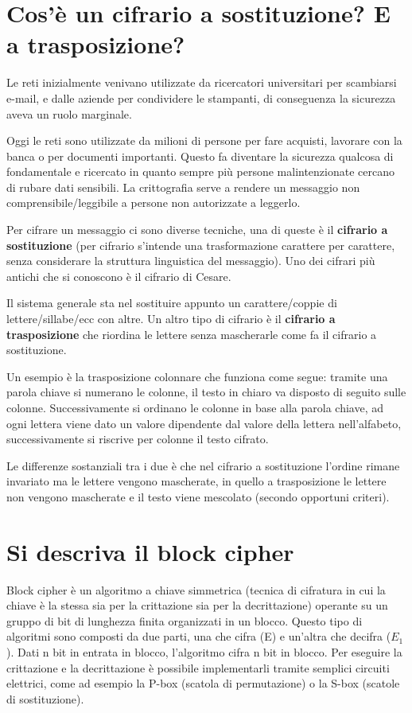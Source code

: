 \section{Cos’è un cifrario a sostituzione? E a trasposizione?}

Le reti inizialmente venivano utilizzate da ricercatori universitari per scambiarsi e-mail, e dalle aziende per condividere le stampanti, di conseguenza la sicurezza aveva un ruolo marginale.

Oggi le reti sono utilizzate da milioni di persone per fare acquisti, lavorare con la banca o per documenti importanti. Questo fa diventare la sicurezza qualcosa di fondamentale e ricercato in quanto sempre più persone malintenzionate cercano di rubare dati sensibili.
La crittografia serve a rendere un messaggio non comprensibile/leggibile a persone non autorizzate a leggerlo.

Per cifrare un messaggio ci sono diverse tecniche, una di queste è il \textbf{cifrario a sostituzione} (per cifrario s’intende una trasformazione carattere per carattere, senza considerare la struttura linguistica del messaggio). Uno dei cifrari più antichi che si conoscono è il cifrario di Cesare.

Il sistema generale sta nel sostituire appunto un carattere/coppie di lettere/sillabe/ecc con altre.
Un altro tipo di cifrario è il \textbf{cifrario a trasposizione} che riordina le lettere senza mascherarle come fa il cifrario a sostituzione.

Un esempio è la trasposizione colonnare che funziona come segue: tramite una parola chiave si numerano le colonne, il testo in chiaro va disposto di seguito sulle colonne. Successivamente si ordinano le colonne in base alla parola chiave, ad ogni lettera viene dato un valore dipendente dal valore della lettera nell’alfabeto, successivamente si riscrive per colonne il testo cifrato.

Le differenze sostanziali tra i due è che nel cifrario a sostituzione l’ordine rimane invariato ma le lettere vengono mascherate, in quello a trasposizione le lettere non vengono mascherate e il testo viene mescolato (secondo opportuni criteri).

\section{Si descriva il block cipher}

Block cipher è un algoritmo a chiave simmetrica (tecnica di cifratura in cui la chiave è la stessa sia per la crittazione sia per la decrittazione) operante su un gruppo di bit di lunghezza finita organizzati in un blocco.
Questo tipo di algoritmi sono composti da due parti, una che cifra (E) e un’altra che decifra ($E_1$).
Dati n bit in entrata in blocco, l’algoritmo cifra n bit in blocco.
Per eseguire la crittazione e la decrittazione è possibile implementarli tramite semplici circuiti elettrici, come ad esempio la P-box (scatola di permutazione) o la S-box (scatole di sostituzione).

